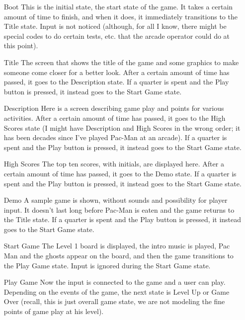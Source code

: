 \documentclass[letter,12pt]{article}
\begin{document}
\begin{enumerate}

\item[Boot] This is the initial state, the start state of the game.  It takes a certain amount of time to finish, and when it does, it immediately transitions to the Title state.  Input is not noticed (although, for all I know, there might be special codes to do certain tests, etc. that the arcade operator could do at this point).

\item[Title] The screen that shows the title of the game and some graphics to make someone come closer for a better look.  After a certain amount of time has passed, it goes to the Description state.  If a quarter is spent and the Play button is pressed, it instead goes to the Start Game state.

\item[Description] Here is a screen describing game play and points for various activities.  After a certain amount of time has passed, it goes to the High Scores state (I might have Description and High Scores in the wrong order; it has been decades since I’ve played Pac-Man at an arcade).  If a quarter is spent and the Play button is pressed, it instead goes to the Start Game state.

\item[High Scores] The top ten scores, with initials, are displayed here.  After a certain amount of time has passed, it goes to the Demo state.  If a quarter is spent and the Play button is pressed, it instead goes to the Start Game state.

\item[Demo] A sample game is shown, without sounds and possibility for player input.  It doesn’t last long before Pac-Man is eaten and the game returns to the Title state.  If a quarter is spent and the Play button is pressed, it instead goes to the Start Game state.

\item[Start Game] The Level 1 board is displayed, the intro music is played, Pac Man and the ghosts appear on the board, and then the game transitions to the Play Game state.  Input is ignored during the Start Game state.

\item[Play Game] Now the input is connected to the game and a user can play.  Depending on the events of the game, the next state is Level Up or Game Over (recall, this is just overall game state, we are not modeling the fine points of game play at his level).


\end{enumerate}
\end{document}
